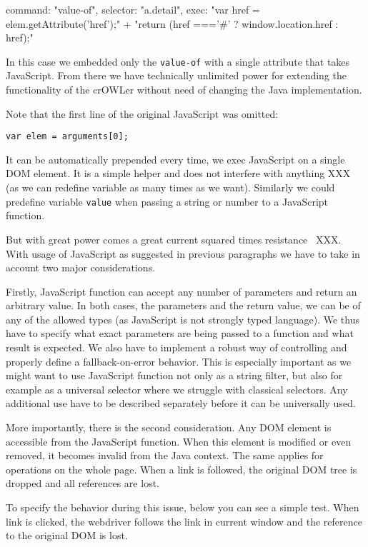 \begtt
{
  command: "value-of", 
  selector: "a.detail", 
  exec: "var href = elem.getAttribute('href');" +
        "return (href ==='#' ? window.location.href : href);"
}
\endtt

In this case we embedded only the {\tt value-of} with a single attribute that
takes JavaScript. From there we have technically unlimited power for extending
the functionality of the crOWLer without need of changing the Java
implementation. 

Note that the first line of the original JavaScript was omitted: 

{\tt var elem = arguments[0];} 

It can be automatically prepended every time, we exec JavaScript on a single
DOM element. It is a simple helper and does not interfere with anything XXX (as
we can redefine variable as many times as we want). Similarly we could
predefine variable {\tt value} when passing a string or number to a JavaScript
function. 

But with great power comes a great current squared times
resistance~ XXX. With usage of JavaScript as
suggested in previous paragraphs we have to take in account two major
considerations. 

Firstly, JavaScript function can accept any number of parameters and return an
arbitrary value. In both cases, the parameters and the return value, we can be
of any of the allowed types (as JavaScript is not strongly typed language). We
thus have to specify what exact parameters are being passed to a function and
what result is expected. We also have to implement a robust way of controlling
and properly define a fallback-on-error behavior. This is especially important
as we might want to use JavaScript function not only as a string filter, but also
for example as a universal selector where we struggle with classical selectors. 
Any additional use have to be described separately before it can be universally
used. 

More importantly, there is the second consideration. Any DOM element is
accessible from the JavaScript function. When this element is modified or even
removed, it becomes invalid from the Java context. The same applies for
operations on the whole page. When a link is followed, the original DOM tree 
is dropped and all references are lost. 

To specify the behavior during this issue, below you can see a simple test.
When link is clicked, the webdriver follows the link in current window and the
reference to the original DOM is lost. 

